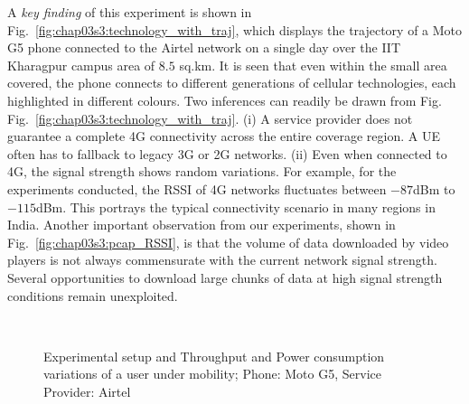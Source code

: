 A \textit{key finding} of this experiment is shown in Fig.~\ref{fig:chap03s3:technology_with_traj}, which displays the trajectory of a Moto G5 phone connected to the Airtel network on a single day over the IIT Kharagpur campus area of $8.5$ sq.km. It is seen that even within the small area covered, the phone connects to different generations of cellular technologies, each highlighted in different colours. Two inferences can readily be drawn from Fig. Fig.~\ref{fig:chap03s3:technology_with_traj}. (i) A service provider does not guarantee a complete \ac{4G} connectivity across the entire coverage region. A \ac{UE} often has to fallback to legacy \ac{3G} or \ac{2G} networks. (ii) Even when connected to \ac{4G}, the signal strength shows random variations. For example, for the experiments conducted, the \ac{RSSI} of \ac{4G} networks fluctuates between $-87$dBm to $-115$dBm. This portrays the typical connectivity scenario in many regions in India.
Another important observation from our experiments, shown in Fig.~\ref{fig:chap03s3:pcap_RSSI}, is that the volume of data downloaded by video players is not always commensurate with the current network signal strength. Several opportunities to download large chunks of data at high signal strength conditions remain unexploited.



\label{sec:chap03s3:EnDASHPilot}
\begin{figure}[!h]
	\captionsetup[subfigure]{width=0.49\linewidth}
	\begin{center}
		\\
	\end{center}
	\caption{Experimental setup and Throughput and Power consumption variations of a user under mobility; Phone: Moto G5, Service Provider: Airtel}
\end{figure}


